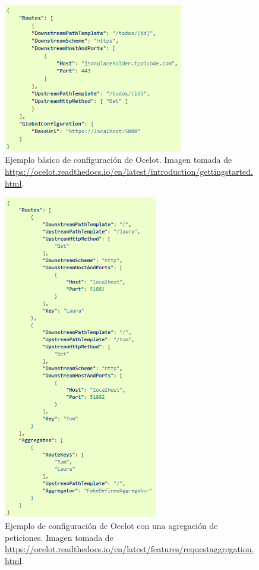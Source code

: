 \documentclass[11pt,spanish,listoffigures]{tfgetsinf}
\begin{document}
\begin{figure}[ht]
\centering
\includegraphics[width=0.7\textwidth]{imagenes/configuracionBasicaOcelot}
\caption[Ejemplo básico de configuración de Ocelot.]{Ejemplo básico de configuración de Ocelot. Imagen tomada de \url{https://ocelot.readthedocs.io/en/latest/introduction/gettingstarted.html}.}
	\label{configuracionBasicaOcelot}
\end{figure}

\begin{figure}[ht]
\centering
\includegraphics[width=0.6\textwidth]{imagenes/configuracionAgregacionOcelot}
\caption[Ejemplo de configuración de Ocelot con una agregación de peticiones.]{Ejemplo de configuración de Ocelot con una agregación de peticiones. Imagen tomada de \url{https://ocelot.readthedocs.io/en/latest/features/requestaggregation.html}.}
	\label{configuracionAgregacionOcelot}
\end{figure}
\end{document}
